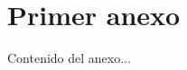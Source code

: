 \documentclass[../main.tex]{subfiles}
\begin{document}
\chapter{Primer anexo}

Contenido del anexo...
\end{document}
